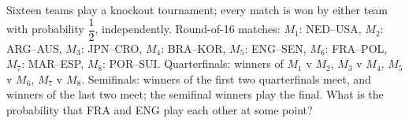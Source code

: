 Sixteen teams play a knockout tournament; every match is won by either team with probability $\dfrac12$, independently. Round-of-16 matches: $M_1$: NED--USA, $M_2$: ARG--AUS, $M_3$: JPN--CRO, $M_4$: BRA--KOR, $M_5$: ENG--SEN, $M_6$: FRA--POL, $M_7$: MAR--ESP, $M_8$: POR--SUI. Quarterfinals: winners of $M_1$ v $M_2$, $M_3$ v $M_4$, $M_5$ v $M_6$, $M_7$ v $M_8$. Semifinals: winners of the first two quarterfinals meet, and winners of the last two meet; the semifinal winners play the final. What is the probability that FRA and ENG play each other at some point?
